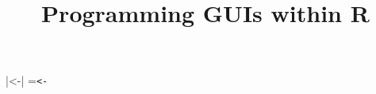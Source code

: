 \newcommand{\args}[1]{\code{#1}} %
\newcommand{\argument}[2]{\args{#1}\index{#2|\texttt{#1}}} %
\newcommand{\subcommand}[2]{\textit{#2} \args{#1}\index{#2|\code{#1}}} %
\newcommand{\subcommanda}[3]{\subcommand{#1}{#2} \textit{#3} }
\newcommand{\option}[2]{\args{#1}\index{#2|\code{#1}}} %
\newcommand{\class}[1]{\code{#1}}  %
\newcommand{\generic}[1]{\code{#1}} %
\newcommand{\meth}[1]{\generic{#1}}     %
\newcommand{\method}[2]{\meth{#1}\index{#2|\code{#1}}} %

\newcommand{\signal}[1]{\code{#1}} %
\newcommand{\dfn}[1]{\textit{#1}} %
\newcommand{\dfnref}[1]{\textit{#1}} %
\newcommand{\env}[1]{\texttt{#1}} %
\newcommand{\file}[1]{\texttt{#1}}
\newcommand{\kbd}[1]{\textmd{#1}}
\newcommand{\pkg}[1]{\texttt{#1}}
\newcommand{\opt}[1]{\texttt{#1}} %
\newcommand{\acronym}[1]{\texttt{#1}}

\newcommand{\tagger}[1]{\texttt{#1}}
\newcommand{\tagattr}[2]{\texttt{#1}} %

\usepackage{fancyvrb}
\DefineShortVerb{\|}
|<-|
\newcommand{\leftBracket}{$<$}
\newcommand{\rightBracket}{$>$}
\newsavebox{\hlboxlessthan}%
\setbox\hlboxlessthan=\hbox{\verb.<-.}%
\newcommand{\ASSIGN}{{}{\usebox{\hlboxlessthan}}{}}
\newcommand{\backslashn}{\code{$\backslash$n}} %

\newcommand{\GTK}{GTK+}
\newcommand{\TCL}{Tcl}
\newcommand{\Tcl}{\TCL}
\newcommand{\TK}{Tk}
\newcommand{\Tk}{Tk}
\newcommand{\tcltk}{Tcl/Tk}
\newcommand{\wxWidgets}{wxWidgets}
\newcommand{\Java}{Java}
\newcommand{\gWidgets}{gWidgets}

\newcommand{\TITLE}{Programming GUIs within R}
\title{\TITLE}
\newcommand{\PACKAGENAME}{ProgGUIInR}
\newcommand{\WINDOZE}{Windows}
\newcommand{\UNIX}{Unix}
\newcommand{\LINUX}{Linux}
\newcommand{\OSX}{Mac OS X}


\usepackage{color}

